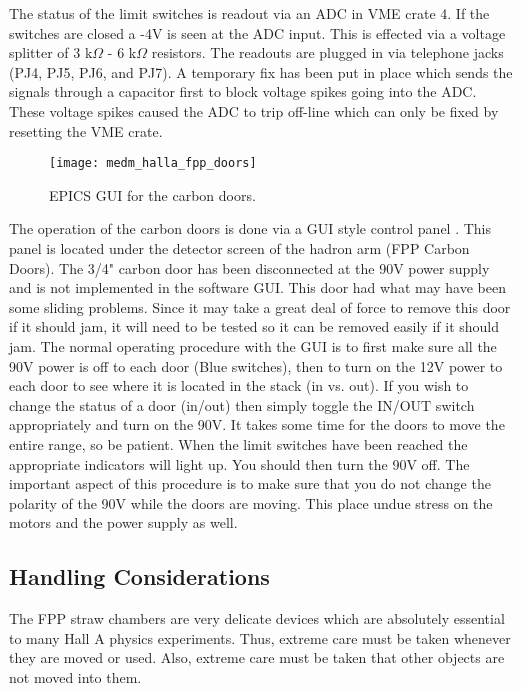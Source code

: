 The status of the limit switches is readout via an ADC in VME crate
4. If the switches are closed a -4V is seen at the ADC input. This is
effected via a voltage splitter of 3 k$\Omega$ - 6 k$\Omega$ resistors. The
readouts are plugged in via telephone jacks (PJ4, PJ5, PJ6, and PJ7). A
temporary fix has been put in place which sends the signals through a
capacitor first to block voltage spikes going into the ADC. These
voltage spikes caused the ADC to trip off-line which can only be
fixed by resetting the VME crate.

\begin{figure}
\begin{center}
\texttt{[image: medm\_halla\_fpp\_doors]}
{\linespread{1.}
\caption[Detectors: FPP Carbon Door GUI]{EPICS GUI for the carbon doors.}
\label{fig:carbon_door_gui}}
\end{center}
\end{figure}

The operation of the carbon doors is done via a GUI style control
panel . This panel is located under the detector screen of the hadron
arm (FPP Carbon Doors). The 3/4" carbon door has been disconnected at
the 90V power supply and is not implemented in the software GUI. This
door had what may have been some sliding problems. Since it may take a
great deal of force to remove this door if it should jam, it will need
to be tested so it can be removed easily if it should jam. The normal
operating procedure with the GUI is to first
make sure all the 90V
power is off to each door (Blue switches), then to
turn on the 12V power to each door to see where it
is located in the stack (in vs.
out). If you wish to change the status of a door (in/out) then simply
toggle the IN/OUT switch appropriately and  turn on the 90V. It takes
some time for the doors to move the entire range, so be patient. When
the limit switches have been reached the appropriate indicators will
light up. You should then turn the 90V off. The important aspect of
this procedure is to make sure that you do not change the polarity of
the 90V while the doors are moving. This place undue stress on the
motors and the power supply as well.

\subsection{Handling Considerations}

The FPP straw chambers are very delicate devices which are absolutely
essential to many Hall A physics experiments.
Thus, extreme care must be taken whenever they are moved or used.
Also, extreme care must be taken that other objects are not moved
into them.

